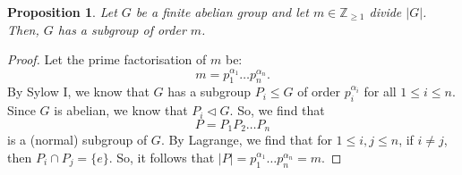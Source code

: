 \documentclass[a4paper, openany]{memoir}
\theoremstyle{definition}
\theoremstyle{plain}
\newtheorem{proposition}[definition]{Proposition}
\begin{document}
    \begin{proposition}
        Let $G$ be a finite abelian group and let $m \in \mathbb{Z}_{\geq 1}$ divide $|G|$. Then, $G$ has a subgroup of order $m$.
    \end{proposition}
    \begin{proof}
        Let the prime factorisation of $m$ be:
        \[m = p_1^{\alpha_1} \dots p_n^{\alpha_n}.\]
        By Sylow I, we know that $G$ has a subgroup $P_i \leq G$ of order $p_i^{\alpha_i}$ for all $1 \leq i \leq n$. Since $G$ is abelian, we know that $P_i \vartriangleleft G$. So, we find that 
        \[P = P_1 P_2 \dots P_n\]
        is a (normal) subgroup of $G$. By Lagrange, we find that for $1 \leq i, j \leq n$, if $i \neq j$, then $P_i \cap P_j = \{e\}$. So, it follows that $|P| = p_1^{\alpha_1} \dots p_n^{\alpha_n} = m$.
    \end{proof}
\end{document}
